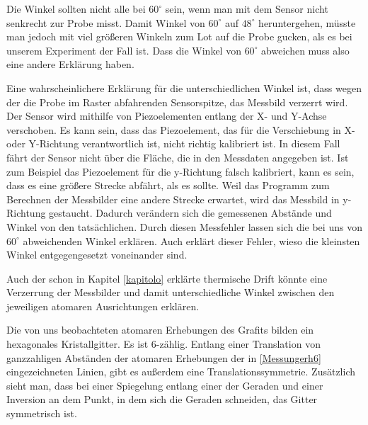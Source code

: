 \documentclass[10pt,a4paper]{article}
\begin{document}
Die Winkel sollten nicht alle bei $60^\circ$ sein, wenn man mit dem Sensor nicht senkrecht zur Probe misst. Damit Winkel von $60^\circ$ auf $48^\circ$ heruntergehen, müsste man jedoch mit viel größeren Winkeln zum Lot auf die Probe gucken, als es bei unserem Experiment der Fall ist. Dass die Winkel von $60^\circ$ abweichen muss also eine andere Erklärung haben.

 Eine wahrscheinlichere Erklärung für die unterschiedlichen Winkel ist, dass wegen der die Probe im Raster abfahrenden Sensorspitze, das Messbild verzerrt wird. Der Sensor wird mithilfe von Piezoelementen entlang der X- und Y-Achse verschoben. Es kann sein, dass das Piezoelement, das für die Verschiebung in X- oder Y-Richtung verantwortlich ist, nicht richtig kalibriert ist. In diesem Fall fährt der Sensor nicht über die Fläche, die in den Messdaten angegeben ist. Ist zum Beispiel das Piezoelement für die y-Richtung falsch kalibriert, kann es sein, dass es eine größere Strecke abfährt, als es sollte. Weil das Programm zum Berechnen der Messbilder eine andere Strecke erwartet, wird das Messbild in y-Richtung gestaucht. Dadurch verändern sich die gemessenen Abstände und Winkel von den tatsächlichen. Durch diesen Messfehler lassen sich die bei uns von $60^\circ$ abweichenden Winkel erklären. Auch erklärt dieser Fehler, wieso die kleinsten Winkel entgegengesetzt voneinander sind.
 
 Auch der schon in Kapitel \ref{kapitolo} erklärte thermische Drift könnte eine Verzerrung der Messbilder und damit unterschiedliche Winkel zwischen den jeweiligen atomaren Ausrichtungen erklären.
 
Die von uns beobachteten atomaren Erhebungen des Grafits bilden ein hexagonales Kristallgitter. Es ist 6-zählig. Entlang einer Translation von ganzzahligen Abständen der atomaren Erhebungen der in \ref{Messungerh6} eingezeichneten Linien, gibt es außerdem eine Translationssymmetrie. Zusätzlich sieht man, dass bei einer Spiegelung entlang einer der Geraden und einer Inversion an dem Punkt, in dem sich die Geraden schneiden, das Gitter symmetrisch ist.
\end{document}
